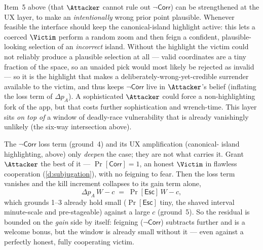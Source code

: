 \begin{remark}\label{rem:canonical-island}
Item~5 above (that $\Attacker$ cannot rule out $\neg\mathsf{Corr}$) can be
strengthened at the UX layer, to make an \emph{intentionally} wrong prior point
plausible. Whenever feasible the interface should keep the canonical-island
highlight active: this lets a coerced $\Victim$ perform a random zoom and then
feign a confident, plausible-looking selection of an \emph{incorrect} island.
Without the highlight the victim could not reliably produce a plausible selection
at all --- valid coordinates are a tiny fraction of the space, so an unaided pick
would most likely be rejected as invalid --- so it is the highlight that makes a
deliberately-wrong-yet-credible surrender available to the victim, and thus keeps
$\neg\mathsf{Corr}$ live in $\Attacker$'s belief (inflating the loss term of
$\Delta p_A$). A sophisticated $\Attacker$ could force a non-highlighting fork of
the app, but that costs further sophistication and wrench-time. This layer sits
\emph{on top of} a window of deadly-race vulnerability that is already
vanishingly unlikely (the six-way intersection above).
\end{remark}

\begin{remark}\label{rem:feigning}
The $\neg\mathsf{Corr}$ loss term (ground~4) and its UX amplification (canonical-
island highlighting, above) only \emph{deepen} the case; they are not what carries
it. Grant $\Attacker$ the best of it --- $\Pr[\mathsf{Corr}] = 1$, an honest
$\Victim$ in flawless cooperation (\ref{d:subjugation}), with no feigning to fear. Then the loss
term vanishes and the kill increment collapses to its gain term alone,
\[
  \Delta p_A\,W - c \;=\; \Pr[\mathsf{Esc}]\,W - c,
\]
which grounds 1--3 already hold small ($\Pr[\mathsf{Esc}]$ tiny, the shaved
interval minute-scale and pre-stageable) against a large $c$ (ground~5). So the
residual is bounded on the \emph{gain} side by itself: feigning ($\neg\mathsf{Corr}$)
subtracts further and is a welcome bonus, but the window is already small without
it --- even against a perfectly honest, fully cooperating victim.
\end{remark}

